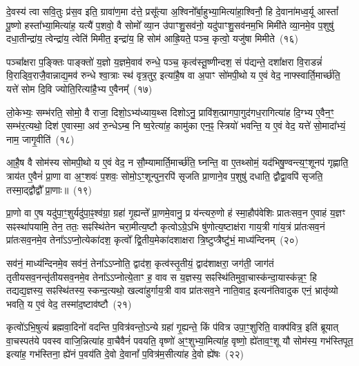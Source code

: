 {\anuvakamend[{वा॒चो हव॑म॒भिघृ॑तानां गृह्णात्यु॒त पञ्च॑विꣳशतिश्च}]}

दे॒वस्य॑ त्वा सवि॒तुः प्र॑स॒व इति॒ ग्रावा॑ण॒मा द॑त्ते॒ प्रसू᳚त्या अ॒श्विनो᳚र्बा॒हुभ्या॒मित्या॑हा॒श्विनौ॒ हि दे॒वाना॑मध्व॒र्यू आस्तां᳚ पू॒ष्णो हस्ता᳚भ्या॒मित्या॑ह॒ यत्यै॑ प॒शवो॒ वै सोमो᳚ व्या॒न उ॑पाꣳशु॒सव॑नो॒ यदु॑पाꣳशु॒सव॑नम॒भि मिमी॑ते व्या॒नमे॒व प॒शुषु॑ दधा॒तीन्द्रा॑य॒ त्वेन्द्रा॑य॒ त्वेति॑ मिमीत॒ इन्द्रा॑य॒ हि सोम॑ आह्रि॒यते॒ पञ्च॒ कृत्वो॒ यजु॑षा मिमीते~(१६)\ip

पञ्चा᳚क्षरा प॒ङ्क्तिः पाङ्क्तो॑ य॒ज्ञो य॒ज्ञमे॒वाव॑ रुन्धे॒ पञ्च॒ कृत्व॑स्तू॒ष्णीन्दश॒ सं प॑द्यन्ते॒ दशा᳚क्षरा वि॒राडन्नं॑ वि॒राड्वि॒राजै॒वान्नाद्य॒मव॑ रुन्धे श्वा॒त्राः स्थ॑ वृत्र॒तुर॒ इत्या॑है॒ष वा अ॒पाꣳ सो॑मपी॒थो य ए॒वं वेद॒ नाफ्स्वार्ति॒मार्च्छ॑ति॒ यत्ते॑ सोम दि॒वि ज्योति॒रित्या॑है॒भ्य ए॒वैनम्᳚~(१७)\ip

लो॒केभ्यः॒ सम्भ॑रति॒ सोमो॒ वै राजा॒ दिशो॒\-ऽभ्य॑ध्याय॒थ्स दिशो\-ऽनु॒ प्रावि॑श॒त्प्रागपा॒गुद॑गध॒रागित्या॑ह दि॒ग्भ्य ए॒वैन॒ꣳ॒ सम्भ॑र॒त्यथो॒ दिश॑ ए॒वास्मा॒ अव॑ रु॒न्धे\-ऽम्ब॒ नि ष्व॒रेत्या॑ह॒ कामु॑का एन॒ꣴ॒ स्त्रियो॑ भवन्ति॒ य ए॒वं वेद॒ यत्ते॑ सो॒मादा᳚भ्यं॒ नाम॒ जागृ॒वीति॑~(१८)\ip

आ॒है॒ष वै सोम॑स्य सोमपी॒थो य ए॒वं वेद॒ न सौ॒म्यामार्ति॒मार्च्छ॑ति॒ घ्नन्ति॒ वा ए॒तथ्सोमं॒ यद॑भिषु॒ण्वन्त्य॒ꣳ॒शूनप॑ गृह्णाति॒ त्राय॑त ए॒वैनं॑ प्रा॒णा वा अ॒ꣳ॒शवः॑ प॒शवः॒ सोमो॒\-ऽꣳ॒शून्पुन॒रपि॑ सृजति प्रा॒णाने॒व प॒शुषु॑ दधाति॒ द्वौद्वा॒वपि॑ सृजति॒ तस्मा॒द्द्वौद्वौ᳚ प्रा॒णाः॥~(१९)\ip

{\anuvakamend[{यजु॑षा मिमीत एनं॒ जागृ॒वीति॒ चतु॑श्चत्वारिꣳशच्च}]}

प्रा॒णो वा ए॒ष यदु॑पा॒ꣳ॒शुर्यदु॑पा॒ꣴ॒श्व॑ग्रा॒ ग्रहा॑ गृ॒ह्यन्ते᳚ प्रा॒णमे॒वानु॒ प्र य॑न्त्यरु॒णो ह॑ स्मा॒हौप॑वेशिः प्रातःसव॒न ए॒वाहं य॒ज्ञꣳ सꣴस्था॑पयामि॒ तेन॒ ततः॒ सꣴस्थि॑तेन चरा॒मीत्य॒ष्टौ कृत्वो\-ऽग्रे॒\-ऽभि षु॑णोत्य॒ष्टाक्ष॑रा गाय॒त्री गा॑य॒त्रं प्रा॑तःसव॒नं प्रा॑तःसव॒नमे॒व तेना᳚\-ऽऽ\-प्नो॒त्येका॑\-दश॒ कृत्वो᳚ द्वि॒तीय॒मेका॑\-दशाक्षरा त्रि॒ष्टुप्त्रैष्टु॑भं॒ माध्य॑न्दिनम्~(२०)\ip

सव॑नं॒ माध्य॑न्दिनमे॒व सव॑नं॒ तेना᳚\-ऽऽ\-प्नोति॒ द्वाद॑श॒ कृत्व॑स्तृ॒तीयं॒ द्वाद॑शाक्षरा॒ जग॑ती॒ जाग॑तं तृतीय\-सव॒नन्तृ॑तीय\-सव॒नमे॒व तेना᳚\-ऽऽ\-प्नोत्ये॒ताꣳ ह॒ वाव स य॒ज्ञस्य॒ सꣴस्थि॑तिमुवा॒चास्क॑न्दा॒यास्क॑न्न॒ꣳ॒ हि तद्यद्य॒ज्ञस्य॒ सꣴस्थि॑तस्य॒ स्कन्द॒त्यथो॒ खल्वा॑हुर्गाय॒त्री वाव प्रा॑तःसव॒ने नाति॒वाद॒ इत्यन॑तिवादुक एनं॒ भ्रातृ॑व्यो भवति॒ य ए॒वं वेद॒ तस्मा॑द॒ष्टाव॑ष्टौ~(२१)\ip

कृत्वो॑\-ऽभि॒षुत्यं॑ ब्रह्मवा॒दिनो॑ वदन्ति प॒वित्र॑वन्तो॒\-ऽन्ये ग्रहा॑ गृ॒ह्यन्ते॒ किं प॑वित्र उपा॒ꣳ॒शुरिति॒ वाक्प॑वित्र॒ इति॑ ब्रूयात् वा॒चस्पत॑ये पवस्व वाजि॒न्नित्या॑ह वा॒चैवैनं॑ पवयति॒ वृष्णो॑ अ॒ꣳ॒शुभ्या॒मित्या॑ह॒ वृष्णो॒ ह्ये॑ताव॒ꣳ॒शू यौ सोम॑स्य॒ गभ॑स्तिपूत॒ इत्या॑ह॒ गभ॑स्तिना॒ ह्ये॑नं प॒वय॑ति दे॒वो दे॒वानां᳚ प॒वित्र॑म॒सीत्या॑ह दे॒वो ह्ये॑षः~(२२)\ip

